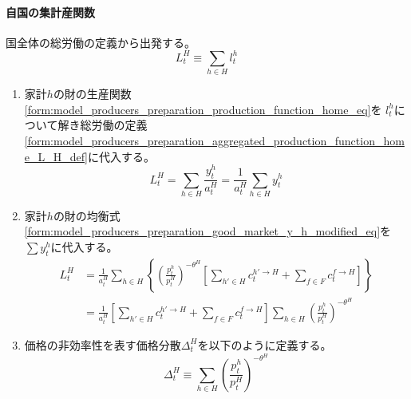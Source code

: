 \paragraph{自国の集計産関数}
\label{sec:model_producers_preparation_aggregated_production_function_home}
国全体の総労働の定義から出発する。
\begin{equation}
\label{form:model_producers_preparation_aggregated_production_function_home_L_H_def}
    L_t^H\equiv\sum_{h\in H}l_t^h
\end{equation}
\begin{enumerate}
    \item
    \label{itm:model_producers_preparation_aggregated_production_function_home_step1}
        家計\(h\)の財の生産関数
        \eqref{form:model_producers_preparation_production_function_home_eq}を
        \(l_t^h\)について解き総労働の定義
        \eqref{form:model_producers_preparation_aggregated_production_function_home_L_H_def}に代入する。
        \begin{equation}
        \label{form:model_producers_preparation_aggregated_production_function_home_step1_L_H_eq}
            L_t^H=\sum_{h\in H}\frac{y_t^h}{a_t^H}=\frac{1}{a_t^H}\sum_{h\in H}y_t^h
        \end{equation}
    \item
    \label{itm:model_producers_preparation_aggregated_production_function_home_step2}
        家計\(h\)の財の均衡式
        \eqref{form:model_producers_preparation_good_market_y_h_modified_eq}を
        \(\sum y_t^h\)に代入する。
        \begin{align}
        \label{form:model_producers_preparation_aggregated_production_function_home_step2_L_H_modified_eq}
            L_t^H&=\frac{1}{a_t^H}\sum_{h\in H}\left\{\left(\frac{p_t^h}{p_t^H}\right)^{-\theta^H}\left[\sum_{h'\in H}c_t^{h'\to H}+\sum_{f\in F}c_t^{f\to H}\right]\right\} \nonumber \\
            &=\frac{1}{a_t^H}\left[\sum_{h'\in H}c_t^{h'\to H}+\sum_{f\in F}c_t^{f\to H}\right]\sum_{h\in H}\left(\frac{p_t^h}{p_t^H}\right)^{-\theta^H}
        \end{align}
    \item
    \label{itm:model_producers_preparation_aggregated_production_function_home_step3}
        価格の非効率性を表す価格分散\(\Delta_t^H\)を以下のように定義する。
        \begin{equation}
        \label{form:model_producers_preparation_aggregated_production_function_home_step2_Delta_H_def}
            \Delta_t^H\equiv\sum_{h\in H}\left(\frac{p_t^h}{p_t^H}\right)^{-\theta^H}

\end{equation}
\end{enumerate}
